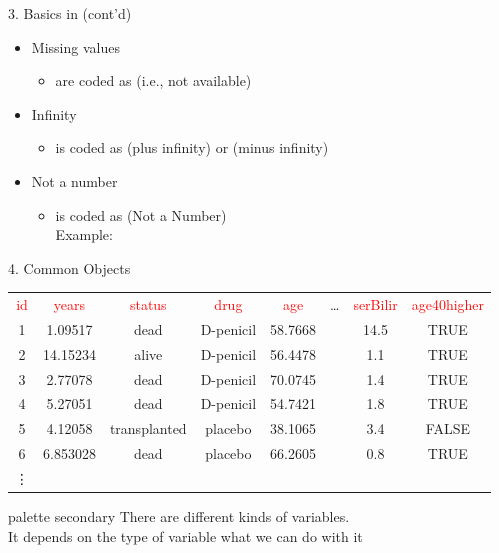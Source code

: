\documentclass[14pt, aspectratio=169, sectionpage=simple, xclolor=table]{beamer}
\begin{document}
\begin{frame}{3. Basics in \R (cont'd)}
\begin{itemize}
\item Missing values
\begin{itemize}
\item are coded as  (i.e., not available) 
\nl
\end{itemize}
\item Infinity
\begin{itemize}
\item is coded as  (plus infinity) or
 (minus infinity) 
\nl
\end{itemize}
\item Not a number
\begin{itemize}
\item is coded as  (Not a Number) \\
Example:  \\
\nl
\end{itemize}
\end{itemize}
\end{frame}
\begin{frame}[fragile]{4. Common \R Objects}
\vspace*{1mm}
{\small{}
\begin{tabular}{cccccccc}
\textcolor{red}{id} &  \textcolor{red}{years} &  \textcolor{red}{status}  &  \textcolor{red}{drug} &  \textcolor{red}{age} & \dots &  \textcolor{red}{serBilir} & \textcolor{red}{age40higher}\\
1& 1.09517& dead&   D-penicil & 58.7668 & & 14.5 & TRUE\\
2& 14.15234& alive&   D-penicil & 56.4478 & & 1.1 & TRUE\\
3& 2.77078& dead& D-penicil & 70.0745 & & 1.4 & TRUE\\
4& 5.27051& dead& D-penicil & 54.7421 & & 1.8 & TRUE\\
5& 4.12058& transplanted&   placebo & 38.1065 & & 3.4 & FALSE\\                                                   
6& 6.853028& dead &   placebo & 66.2605 & & 0.8 & TRUE\\
\vdots &&&&&&&
\end{tabular}
}

\begin{beamercolorbox}[wd=\linewidth, ht=5ex, dp=1.125ex,center]{palette secondary}
 There are different kinds of variables.\\
  It depends on the type of variable what we can do with it
\end{beamercolorbox}
\end{frame}
\end{document}
